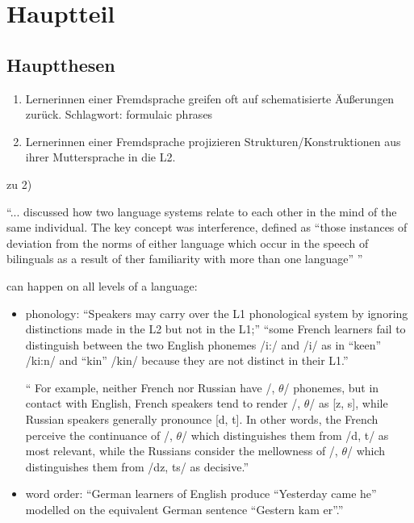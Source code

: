 \section{Hauptteil}

\subsection{Hauptthesen}
\begin{enumerate}
    \item Lernerinnen einer Fremdsprache greifen oft auf schematisierte Äußerungen zurück.
Schlagwort: formulaic phrases
    \item Lernerinnen einer Fremdsprache projizieren Strukturen/Konstruktionen aus ihrer Muttersprache in die L2.
\end{enumerate}


zu 2)

\cite{Weinreich79} ``... discussed how two language systems relate to each other in the mind of the same individual.
The key concept was interference, defined as ``those instances of deviation from the norms of either language which occur in the speech of bilinguals as a result of ther familiarity with more than one language'' \cite{Weinreich79} '' \cite{Cook93}

can happen on all levels of a language:
\begin{itemize}
    \item phonology: ``Speakers may carry over the L1 phonological system by ignoring distinctions made in the L2 but not in the L1;'' \cite{Cook93}
        ``some French learners fail to distinguish between the two English phonemes /i:/ and /i/ as in ``keen'' /ki:n/ and ``kin'' /kin/ because they are not distinct in their L1.''

        \cite{Weinreich79} `` For example, neither French nor Russian have /, $\theta$/ phonemes, but in contact
        with English, French speakers tend to render /, $\theta$/ as [z, s], while Russian
        speakers generally pronounce [d, t].
        In other words, the French perceive the continuance of /, $\theta$/ which distinguishes them from /d, t/ as most relevant, while
        the Russians consider the mellowness of /, $\theta$/ which distinguishes them from /dz, ts/ as decisive.''


    \item word order: ``German learners of English produce ``Yesterday came he'' modelled on the equivalent German sentence ``Gestern kam er''.''
\end{itemize}

